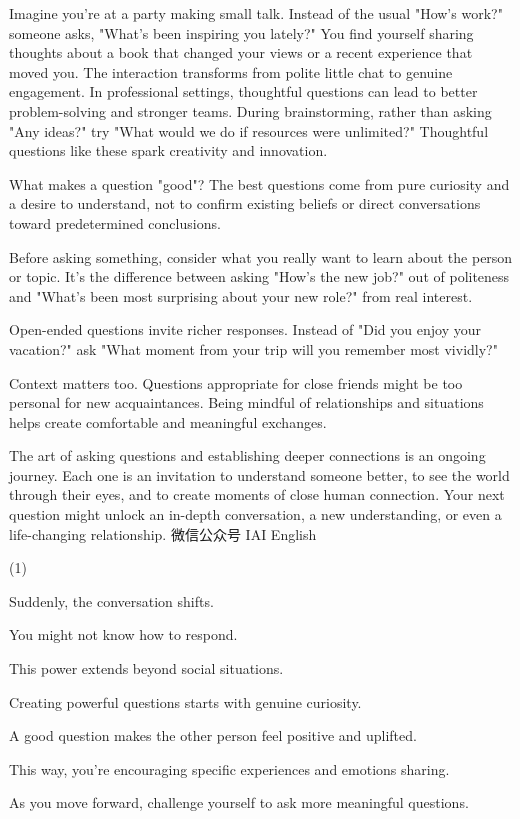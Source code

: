 \documentclass{英语试卷}
\begin{document}
\par Imagine you're at a party making small talk. Instead of the usual "How's work?" someone asks, "What's been inspiring you lately?"  You find yourself sharing thoughts about a book that changed your views or a recent experience that moved you. The interaction transforms from polite little chat to genuine engagement.  In professional settings, thoughtful questions can lead to better problem-solving and stronger teams. During brainstorming, rather than asking "Any ideas?" try "What would we do if resources were unlimited?" Thoughtful questions like these spark creativity and innovation.\par
\par What makes a question "good"? The best questions come from pure curiosity and a desire to understand, not to confirm existing beliefs or direct conversations toward predetermined conclusions.\par
\par {} Before asking something, consider what you really want to learn about the person or topic. It's the difference between asking "How's the new job?" out of politeness and "What's been most surprising about your new role?" from real interest.\par
\par Open-ended questions invite richer responses. Instead of "Did you enjoy your vacation?" ask "What moment from your trip will you remember most vividly?" \par
\par Context matters too. Questions appropriate for close friends might be too personal for new acquaintances. Being mindful of relationships and situations helps create comfortable and meaningful exchanges.\par
\par The art of asking questions and establishing deeper connections is an ongoing journey.  Each one is an invitation to understand someone better, to see the world through their eyes, and to create moments of close human connection. Your next question might unlock an in-depth conversation, a new understanding, or even a life-changing relationship. 微信公众号 IAI English\par
\begin{choices}(1)
  \item Suddenly, the conversation shifts.
  \item You might not know how to respond.
  \item This power extends beyond social situations.
  \item Creating powerful questions starts with genuine curiosity.
  \item A good question makes the other person feel positive and uplifted.
  \item This way, you're encouraging specific experiences and emotions sharing.
  \item As you move forward, challenge yourself to ask more meaningful questions.
\end{choices}
\end{document}
